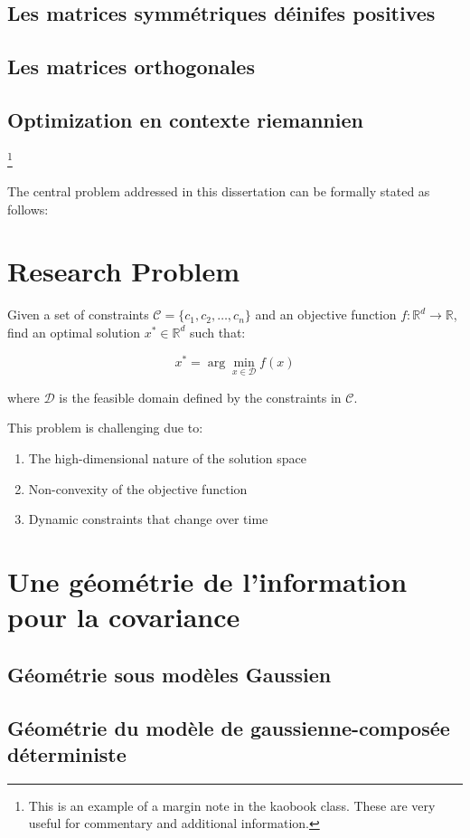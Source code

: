 \subsection{Les matrices symmétriques déinifes positives}
\label{subsec:context-riemann-spd}

\subsection{Les matrices orthogonales}
\label{subsec:context-riemann-orthogonal}


\subsection{Optimization en contexte riemannien}
\label{subsec:context-riemann-optimization}

\footnote{This is an example of a margin note in the kaobook class. These are very useful for commentary and additional information.}

The central problem addressed in this dissertation can be formally stated as follows:

\section*{Research Problem}
Given a set of constraints $\mathcal{C} = \{c_1, c_2, \ldots, c_n\}$ and an objective function $f: \mathbb{R}^d \rightarrow \mathbb{R}$, find an optimal solution $x^* \in \mathbb{R}^d$ such that:

\begin{equation}
\label{eq:main_problem}
x^* = \arg\min_{x \in \mathcal{D}} f(x)
\end{equation}

where $\mathcal{D}$ is the feasible domain defined by the constraints in $\mathcal{C}$.



This problem is challenging due to:
\begin{enumerate}
    \item The high-dimensional nature of the solution space
    \item Non-convexity of the objective function
    \item Dynamic constraints that change over time
\end{enumerate}

\section{Une géométrie de l'information pour la covariance}
\label{sec:context-information-geometry}


\subsection{Géométrie sous modèles Gaussien}
\label{subsec:context-geometry-gaussian}


\subsection{Géométrie du modèle de gaussienne-composée déterministe}
\label{subsec:context-geometry-compound-gaussian}
